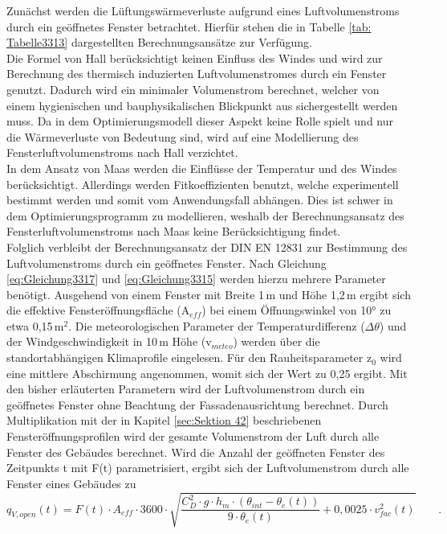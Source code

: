 Zunächst werden die Lüftungswärmeverluste aufgrund eines Luftvolumenstroms durch ein geöffnetes Fenster betrachtet.
Hierfür stehen die in Tabelle \ref{tab: Tabelle3313} dargestellten Berechnungsansätze zur Verfügung.\\
Die Formel von Hall berücksichtigt keinen Einfluss des Windes und wird zur Berechnung des thermisch induzierten Luftvolumenstromes durch ein Fenster genutzt.
Dadurch wird ein minimaler Volumenstrom berechnet, welcher von einem hygienischen und bauphysikalischen Blickpunkt aus sichergestellt werden muss.
Da in dem Optimierungsmodell dieser Aspekt keine Rolle spielt und nur die Wärmeverluste von Bedeutung sind, wird auf eine Modellierung des Fensterluftvolumenstroms nach Hall verzichtet.\\
In dem Ansatz von Maas werden die Einflüsse der Temperatur und des Windes berücksichtigt.
Allerdings werden Fitkoeffizienten benutzt, welche experimentell bestimmt werden und somit vom Anwendungsfall abhängen.
Dies ist schwer in dem Optimierungsprogramm zu modellieren, weshalb der Berechnungsansatz des Fensterluftvolumenstroms nach Maas keine Berücksichtigung findet.\\
Folglich verbleibt der Berechnungsansatz der DIN EN 12831 zur Bestimmung des Luftvolumenstroms durch ein geöffnetes Fenster.
Nach Gleichung \ref{eq:Gleichung3317} und \ref{eq:Gleichung3315} werden hierzu mehrere Parameter benötigt. 
Ausgehend von einem Fenster mit Breite 1\,m und Höhe 1,2\,m ergibt sich die effektive Fensteröffnungsfläche (A\(_{eff}\)) bei einem Öffnungswinkel von 10° zu etwa 0,15\,m\(^2\).
Die meteorologischen Parameter der Temperaturdifferenz (\(\Delta \theta\)) und der Windgeschwindigkeit in 10\,m Höhe (v\(_{meteo}\)) werden über die standortabhängigen Klimaprofile eingelesen.
Für den Rauheitsparameter z\(_0\) wird eine mittlere Abschirmung angenommen, womit sich der Wert zu 0,25 ergibt.
Mit den bisher erläuterten Parametern wird der Luftvolumenstrom durch ein geöffnetes Fenster ohne Beachtung der Fassadenausrichtung berechnet.
Durch Multiplikation mit der in Kapitel \ref{sec:Sektion 42} beschriebenen Fensteröffnungsprofilen wird der gesamte Volumenstrom der Luft durch alle Fenster des Gebäudes berechnet.
Wird die Anzahl der geöffneten Fenster des Zeitpunkts t mit F(t) parametrisiert, ergibt sich der Luftvolumenstrom durch alle Fenster eines Gebäudes zu
\begin{equation}
\label{eq:Gleichung511}
q_{V,open}(t) = F(t) \cdot A_{eff} \cdot 3600 \cdot \sqrt{\frac{C_{D}^2 \cdot g \cdot h_m \cdot ( \theta_{int} - \theta_{e}(t))}{9 \cdot \theta_{e}(t)} + 0,0025 \cdot v_{fac}^2(t)} \qquad \text{.}
\end{equation}

